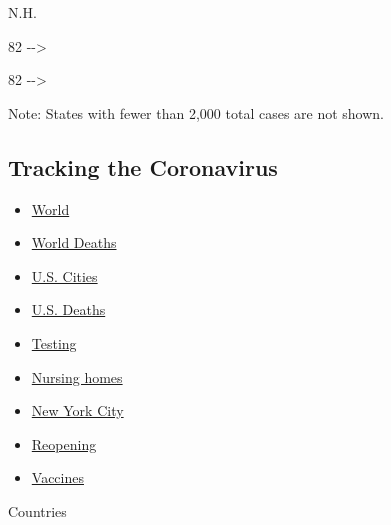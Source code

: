 N.H.

82 -\/-\textgreater{}

82 -\/-\textgreater{}

Note: States with fewer than 2,000 total cases are not shown.

\hypertarget{tracking-the-coronavirus}{%
\subsection{Tracking the Coronavirus}\label{tracking-the-coronavirus}}

\begin{itemize}
\tightlist
\item
  \href{https://www.nytimes.com/interactive/2020/world/coronavirus-maps.html}{World}
\item
  \href{https://www.nytimes.com/interactive/2020/04/21/world/coronavirus-missing-deaths.html}{World
  Deaths}
\item
  \href{https://www.nytimes.com/interactive/2020/04/23/upshot/five-ways-to-monitor-coronavirus-outbreak-us.html}{U.S.
  Cities}
\item
  \href{https://www.nytimes.com/interactive/2020/05/05/us/coronavirus-death-toll-us.html}{U.S.
  Deaths}
\item
  \href{https://www.nytimes.com/interactive/2020/us/coronavirus-testing.html}{Testing}
\item
  \href{https://www.nytimes.com/interactive/2020/us/coronavirus-nursing-homes.html}{Nursing
  homes}
\item
  \href{https://www.nytimes.com/interactive/2020/nyregion/new-york-city-coronavirus-cases.html}{New
  York City}
\item
  \href{https://www.nytimes.com/interactive/2020/us/states-reopen-map-coronavirus.html}{Reopening}
\item
  \href{https://www.nytimes.com/interactive/2020/science/coronavirus-vaccine-tracker.html}{Vaccines}
\end{itemize}

Countries

